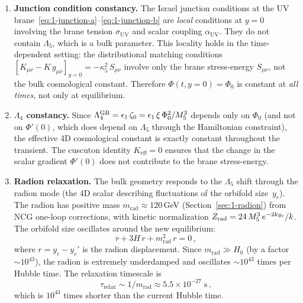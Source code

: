 \begin{enumerate}
\item \textbf{Junction condition constancy.} The Israel junction conditions at the UV brane~\eqref{eq:1-junction-a}--\eqref{eq:1-junction-b} are \emph{local} conditions at $y = 0$ involving the brane tension $\sigma_{\mathrm{UV}}$ and scalar coupling $\alpha_{\mathrm{UV}}$. They do not contain $\Lambda_5$, which is a bulk parameter. This locality holds in the time-dependent setting: the distributional matching conditions $[K_{\mu\nu} - K\, g_{\mu\nu}]_{y=0} = -\kappa_5^2\, S_{\mu\nu}$ involve only the brane stress-energy $S_{\mu\nu}$, not the bulk cosmological constant. Therefore $\Phi(t, y{=}0) = \Phi_0$ is constant at \emph{all times}, not only at equilibrium.

\item \textbf{$\Lambda_4$ constancy.} Since $\Lambda_4^{\mathrm{GB}} = \epsilon_1\,\zeta_0 = \epsilon_1\,\xi\,\Phi_0^2/M_5^3$ depends only on $\Phi_0$ (and not on $\Phi'(0)$, which does depend on $\Lambda_5$ through the Hamiltonian constraint), the effective 4D cosmological constant is exactly constant throughout the transient. The cuscuton identity $K_{\mathrm{eff}} = 0$ ensures that the change in the scalar gradient $\Phi'(0)$ does not contribute to the brane stress-energy.

\item \textbf{Radion relaxation.} The bulk geometry responds to the $\Lambda_5$ shift through the radion mode (the 4D scalar describing fluctuations of the orbifold size~$y_c$). The radion has positive mass $m_{\mathrm{rad}} \approx 120\,$GeV (Section~\ref{sec:1-radion}) from NCG one-loop corrections, with kinetic normalization $Z_{\mathrm{rad}} = 24\,M_5^3\,e^{-2ky_c}/k$. The orbifold size oscillates around the new equilibrium:
\begin{equation}
\ddot{r} + 3H\,\dot{r} + m_{\mathrm{rad}}^2\,r = 0\,,
\end{equation}
where $r = y_c - y_c'$ is the radion displacement. Since $m_{\mathrm{rad}} \gg H_0$ (by a factor $\sim 10^{43}$), the radion is extremely underdamped and oscillates $\sim 10^{43}$ times per Hubble time. The relaxation timescale is
\begin{equation}
\tau_{\mathrm{relax}} \sim 1/m_{\mathrm{rad}} \approx 5.5 \times 10^{-27}\;\mathrm{s}\,,
\end{equation}
which is $10^{43}$ times shorter than the current Hubble time.


\end{enumerate}
